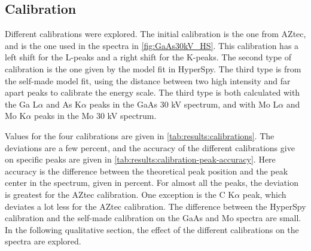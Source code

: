 



\subsection{Calibration}
\label{sec:results:qualitative:calibration}

Different calibrations were explored.
The initial calibration is the one from AZtec, and is the one used in the spectra in \cref{fig:GaAs30kV_HS}.
This calibration has a left shift for the L-peaks and a right shift for the K-peaks.
The second type of calibration is the one given by the model fit in HyperSpy.
The third type is from the self-made model fit, using the distance between two high intensity and far apart peaks to calibrate the energy scale.
The third type is both calculated with the Ga L$\alpha$ and As K$\alpha$ peaks in the GaAs 30 kV spectrum, and with Mo L$\alpha$ and Mo K$\alpha$ peaks in the Mo 30 kV spectrum.

Values for the four calibrations are given in \cref{tab:results:calibrations}.
The deviations are a few percent, and the accuracy of the different calibrations give on specific peaks are given in \cref{tab:results:calibration-peak-accuracy}.
Here accuracy is the difference between the theoretical peak position and the peak center in the spectrum, given in percent.
For almost all the peaks, the deviation is greatest for the AZtec calibration.
One exception is the C K$\alpha$ peak, which deviates a lot less for the AZtec calibration. %
The difference between the HyperSpy calibration and the self-made calibration on the GaAs and Mo spectra are small.
In the following qualitative section, the effect of the different calibrations on the spectra are explored.













